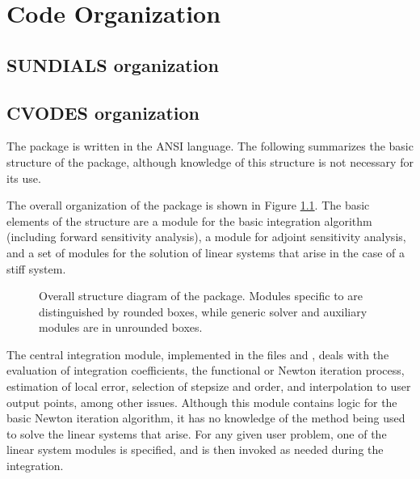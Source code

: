 \chapter{Code Organization}\label{s:organization}

\section{SUNDIALS organization}\label{ss:sun_org}


\section{CVODES organization}\label{ss:cvodes_org}

The {\cvodes} package is written in the ANSI {\C} language. The following
summarizes the basic structure of the package, although knowledge
of this structure is not necessary for its use.

The overall organization of the {\cvodes} package is shown in Figure
\ref{f:cvsorg}.  The basic elements of the structure are a module for
the basic integration algorithm (including forward sensitivity analysis),
a module for adjoint sensitivity analysis, and a set of modules for the solution
of linear systems that arise in the case of a stiff system.  
\begin{figure}
{\centerline{}}
\caption [Overall structure diagram of the {\cvodes} package]
{Overall structure diagram of the {\cvodes} package.
  Modules specific to {\cvodes} are distinguished by rounded boxes, while 
  generic solver and auxiliary modules are in unrounded boxes.}
\label{f:cvsorg}
\end{figure}

The central integration module, implemented in the files 
 and , deals with the evaluation of integration coefficients,
the functional or Newton iteration process, estimation of local error,
selection of stepsize and order, and interpolation to user output
points, among other issues.  Although this module contains logic for
the basic Newton iteration algorithm, it has no knowledge of the
method being used to solve the linear systems that arise.  For any
given user problem, one of the linear system modules is specified, and
is then invoked as needed during the integration. 

